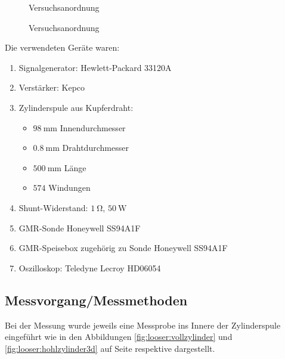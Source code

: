 \begin{figure}[!htb]
    \resizebox{\textwidth}{!}{}
    \caption{Versuchsanordnung}
    \label{fig:versuch:1}
\end{figure}
\begin{figure}[!htb]
    \resizebox{\textwidth}{!}{}
    \caption{Versuchsanordnung}
    \label{fig:versuch:2}
\end{figure}

Die verwendeten Ger\"ate waren:
\begin{enumerate}
    \item
        Signalgenerator: Hewlett-Packard 33120A
    \item
        Verst\"arker: Kepco
    \item
        Zylinderspule aus Kupferdraht:
        \begin{itemize}
            \item
               $\SI{98}{\milli\meter}$ Innendurchmesser
           \item
               $\SI{0.8}{\milli\meter}$ Drahtdurchmesser
           \item
               $\SI{500}{\milli\meter}$ L\"ange
           \item
               $\num{574}$ Windungen
        \end{itemize}
    \item
        Shunt-Widerstand: $\SI{1}{\ohm}$, $\SI{50}{\watt}$
    \item
        GMR-Sonde Honeywell SS94A1F
    \item
        GMR-Speisebox zugeh\"orig zu Sonde Honeywell SS94A1F
    \item
        Oszilloskop: Teledyne Lecroy HD06054
\end{enumerate}


\subsection{Messvorgang/Messmethoden}
\label{sec:durchf:subsec:messmethoden}


Bei  der Messung  wurde jeweils  eine Messprobe  ins Innere  der Zylinderspule
eingef\"uhrt   wie  in   den  Abbildungen   \ref{fig:looser:vollzylinder}  und
\ref{fig:looser:hohlzylinder3d}  auf  Seite  \pageref{fig:looser:vollzylinder}
respektive \pageref{fig:looser:hohlzylinder3d} dargestellt.

